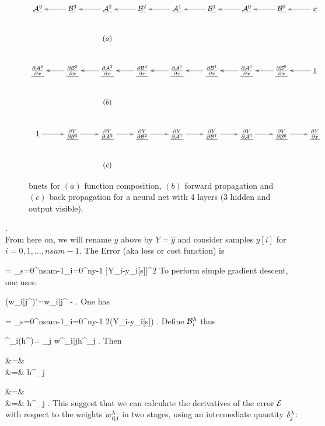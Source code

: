 \begin{figure}[h!]
\centering
$$
\xymatrix{
\ul{\cala^3}
&
\ul{\calb^3}\ar[l]
&
\ul{\cala^2}\ar[l]
&
\ul{\calb^2}\ar[l]
&
\ul{\cala^1}\ar[l]
&
\ul{\calb^1}\ar[l]
&
\ul{\cala^0}\ar[l]
&
\ul{\calb^0}\ar[l]
&
\rvx\ar[l]
\\
&&\text{$(a)$}
\\
\ul{\pder{\cala^3}{x}}
&
\ul{\pder{\calb^3}{x}}\ar[l]
&
\ul{\pder{\cala^2}{x}}\ar[l]
&
\ul{\pder{\calb^2}{x}}\ar[l]
&
\ul{\pder{\cala^1}{x}}\ar[l]
&
\ul{\pder{\calb^1}{x}}\ar[l]
&
\ul{\pder{\cala^0}{x}}\ar[l]
&
\ul{\pder{\calb^0}{x}}\ar[l]
&
\ul{1}\ar[l]
\\
&&\text{$(b)$}
\\
\ul{1}\ar[r]
&
\ul{\pder{Y}{\calb^3}}\ar[r]
&
\ul{\pder{Y}{\cala^2}}\ar[r]
&
\ul{\pder{Y}{\calb^2}}\ar[r]
&
\ul{\pder{Y}{\cala^1}}\ar[r]
&
\ul{\pder{Y}{\calb^1}}\ar[r]
&
\ul{\pder{Y}{\cala^0}}\ar[r]
&
\ul{\pder{Y}{\calb^0}}\ar[r]
&
\ul{\pder{Y}{x}}
\\
&&\text{$(c)$}
}
$$
\caption{bnets for $(a)$ function
composition, $(b)$
forward propagation and $(c)$ back propagation
for a neural net with 4 layers (3 hidden and
output visible).}
\label{fig-backp-nn}
\end{figure}
.\\
From here on, we will rename $y$ above
by $Y=\hat{y}$ and 
consider samples $y[i]$ for 
$i=0, 1, \ldots, nsam-1$.
The Error (aka loss or cost function) is

\beq
\cale =
\sum_{s=0}^{nsam-1}\sum_{i=0}^{ny-1}
|Y_i-y_i[s]|^2
\eeq
To perform simple gradient descent,
one uses:

\beq
(w_{i|j}^\lam)'=w_{i|j}^\lam
-\eta{}
\;.
\eeq
One has

\beq
{}=
\sum_{s=0}^{nsam-1}\sum_{i=0}^{ny-1}
2(Y_i-y_i[s])
\;.
\eeq
Define ${\cal B}^\lambda_i$ thus


\beq
\calb^\lam_i(h^{})=
\sum_j w^{\lam}_{i|j}h^{}_j
\;.
\label{eq-calb}
\eeq
Then

\beqa
{}&=&
\\
&=&
h^{}_j
\eeqa

\beqa
{}&=&
\\
&=&
h^{}_j
\;.
\eeqa
This suggest that
we can calculate 
the derivatives of the error
${\cal E}$
with respect to the weights
$w^\lambda_{i|j}$ in two 
stages, using an intermediate 
quantity $\delta^\lambda_j$:

